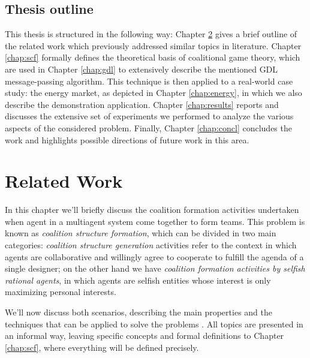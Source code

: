 \documentclass[11pt, twoside, titlepage, a4paper, openright]{report}
\begin{document}
\section{Thesis outline}

This thesis is structured in the following way: Chapter \ref{chap:relwork} gives a brief outline of the related work which previously addressed similar topics in literature. Chapter \ref{chap:scf} formally defines the theoretical basis of coalitional game theory, which are used in Chapter \ref{chap:gdl} to extensively describe the mentioned GDL message-passing algorithm. This technique is then applied to a real-world case study: the energy market, as depicted in Chapter \ref{chap:energy}, in which we also describe the demonstration application. 
Chapter \ref{chap:results} reports and discusses the extensive set of experiments we performed to analyze the various aspects of the considered problem. Finally, Chapter \ref{chap:concl} concludes the work and highlights possible directions of future work in this area.


\chapter{Related Work}\label{chap:relwork}

In this chapter we'll briefly discuss the coalition formation activities undertaken when agent in a multiagent system come together to form teams. This problem is known as \textit{coalition structure formation}, which can be divided in two main categories: \textit{coalition structure generation} activities refer to the context in which agents are collaborative and willingly agree to cooperate to fulfill the agenda of a single designer; on the other hand we have \textit{coalition formation activities by selfish rational agents}, in which agents are selfish entities whose interest is only maximizing personal interests. 

We'll now discuss both scenarios, describing the main properties and the techniques that can be applied to solve the problems \cite{DBLP:series/synthesis/2011Chalkiadakis}. All topics are presented in an informal way, leaving specific concepts and formal definitions to Chapter \ref{chap:scf}, where everything will be defined precisely.
\end{document}
